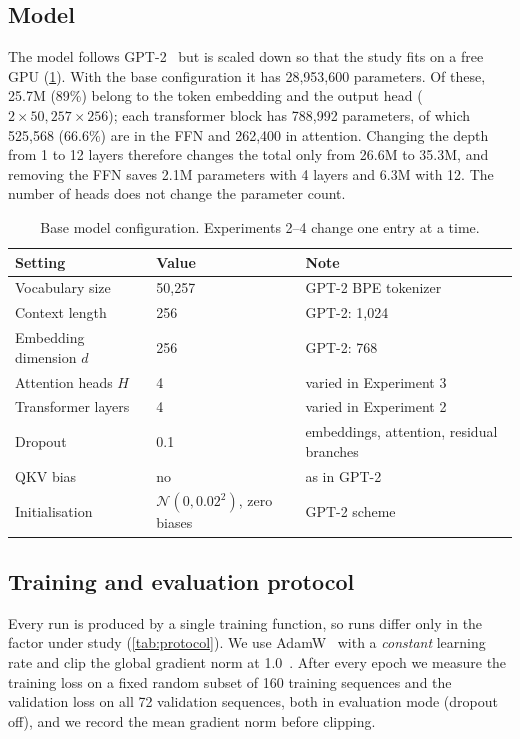 \documentclass[11pt,a4paper]{article}
\begin{document}
\begin{table}[h]
  \centering
  \caption{Dataset statistics.}
  \label{tab:dataset}
  
\end{table}

\subsection{Model}
The model follows GPT-2~\cite{radford2019gpt2,raschka2024llm} but is scaled down so that the study fits on a free GPU (\cref{tab:model}). With the base configuration it has 28,953,600 parameters. Of these, 25.7M (89\%) belong to the token embedding and the output head ($2 \times 50{,}257 \times 256$); each transformer block has 788,992 parameters, of which 525,568 (66.6\%) are in the FFN and 262,400 in attention. Changing the depth from 1 to 12 layers therefore changes the total only from 26.6M to 35.3M, and removing the FFN saves 2.1M parameters with 4 layers and 6.3M with 12. The number of heads does not change the parameter count.

\begin{table}[h]
  \centering
  \small
  \caption{Base model configuration. Experiments 2--4 change one entry at a time.}
  \label{tab:model}
  \begin{tabular}{lll}
    \toprule
    Setting & Value & Note \\
    \midrule
    Vocabulary size & 50,257 & GPT-2 BPE tokenizer \\
    Context length & 256 & GPT-2: 1,024 \\
    Embedding dimension $d$ & 256 & GPT-2: 768 \\
    Attention heads $H$ & 4 & varied in Experiment 3 \\
    Transformer layers & 4 & varied in Experiment 2 \\
    Dropout~\cite{srivastava2014dropout} & 0.1 & embeddings, attention, residual branches \\
    QKV bias & no & as in GPT-2 \\
    Initialisation & $\mathcal{N}(0, 0.02^2)$, zero biases & GPT-2 scheme \\
    \bottomrule
  \end{tabular}
\end{table}

\subsection{Training and evaluation protocol}
Every run is produced by a single training function, so runs differ only in the factor under study (\cref{tab:protocol}). We use AdamW~\cite{loshchilov2019adamw} with a \emph{constant} learning rate and clip the global gradient norm at 1.0~\cite{pascanu2013difficulty}. After every epoch we measure the training loss on a fixed random subset of 160 training sequences and the validation loss on all 72 validation sequences, both in evaluation mode (dropout off), and we record the mean gradient norm before clipping.
\end{document}
